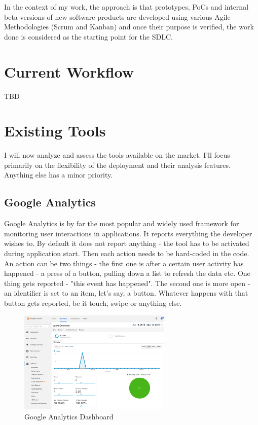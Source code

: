 In the context of my work, the approach is that prototypes, PoCs and internal beta versions of new software products are developed using various Agile Methodologies (Scrum and Kanban) and once their purpose is verified, the work done is considered as the starting point for the SDLC.

\section{Current Workflow}

TBD


\section{Existing Tools}

I will now analyze and assess the tools available on the market. I'll focus primarily on the flexibility of the deployment and their analysis features. Anything else has a minor priority.

\subsection{Google Analytics}

Google Analytics is by far the most popular and widely used framework for monitoring user interactions in applications. It reports everything the developer wishes to. By default it does not report anything - the tool has to be activated during application start. Then each action needs to be hard-coded in the code. An action can be two things - the first one is after a certain user activity has happened - a press of a button, pulling down a list to refresh the data etc. One thing gets reported - "this event has happened". The second one is more open - an identifier is set to an item, let's say, a button. Whatever happens with that button gets reported, be it touch, swipe or anything else.

\begin{figure}[!ht]
	\centering
	\includegraphics[width=0.65\textwidth]{figures/analytics}
    \caption{Google Analytics Dashboard}
\end{figure}

